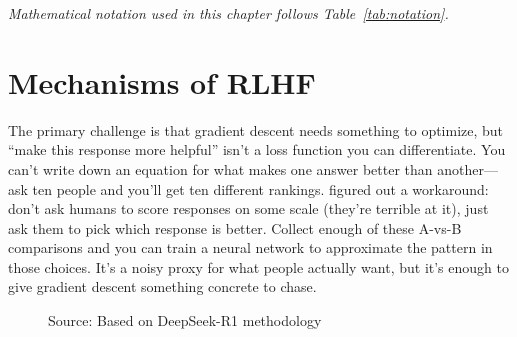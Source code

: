 \documentclass[12pt,a4paper]{report}
\theoremstyle{definition}
\newcommand{\source}[1]{\vspace{-0.5\baselineskip}\caption*{\small Source: #1}}
\begin{document}
\vspace{0.3cm}

\noindent\textit{Mathematical notation used in this chapter follows Table~\ref{tab:notation}.}

\section{Mechanisms of RLHF}
\label{sec:rlhf_mech}
The primary challenge is that gradient descent needs something to optimize, but ``make this response more helpful'' isn't a loss function you can differentiate. You can't write down an equation for what makes one answer better than another---ask ten people and you'll get ten different rankings. \citet{christiano2017deep} figured out a workaround: don't ask humans to score responses on some scale (they're terrible at it), just ask them to pick which response is better. Collect enough of these A-vs-B comparisons and you can train a neural network to approximate the pattern in those choices. It's a noisy proxy for what people actually want, but it's enough to give gradient descent something concrete to chase.

\begin{figure}[htbp]
\centering
{}
\caption{Pretraining and two-stage post-training (Base $\rightarrow$ SFT $\rightarrow$ RL); distinct from the proposed SFT$\rightarrow$RL$\rightarrow$RAG pipeline of Chapter~\ref{ch:experiments}. \textbf{Stage 1:} A base model supplies language understanding. \textbf{Stage 2:} Imitation learning on 5K--10K examples drills task formats. \textbf{Stage 3:} RL tunes the policy through environment interaction, letting agents cope with novel situations outside their training distribution.}
\label{fig:rl_pipeline}
\source{Based on DeepSeek-R1 methodology~\cite{deepseek2025r1}}
\end{figure}
\end{document}

